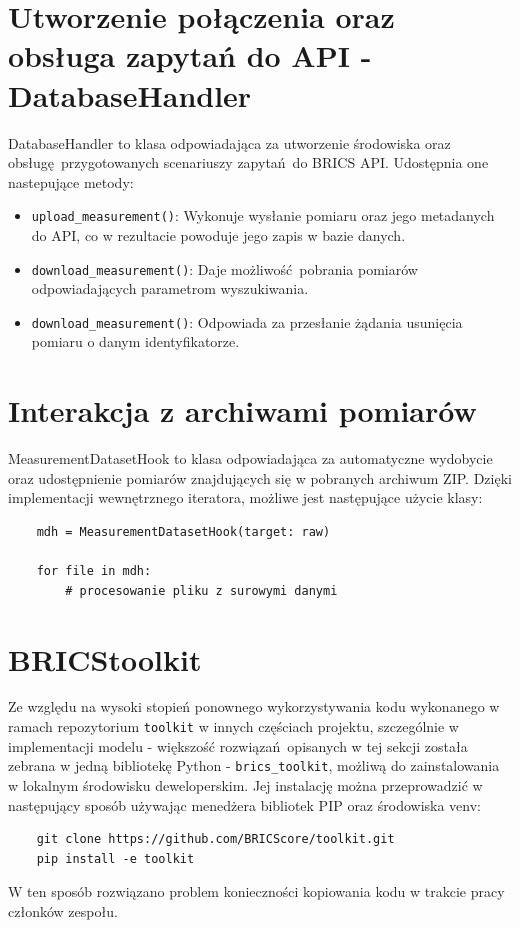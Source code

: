 \section{Utworzenie połączenia oraz obsługa zapytań do API - DatabaseHandler}
DatabaseHandler to klasa odpowiadająca za utworzenie środowiska oraz obsługę przygotowanych scenariuszy zapytań do BRICS API. Udostępnia one nastepujące metody:
\begin{itemize}
	\item \verb|upload_measurement()|: Wykonuje wysłanie pomiaru oraz jego metadanych do API, co w rezultacie powoduje jego zapis w bazie danych.
	\item \verb|download_measurement()|: Daje możliwość pobrania pomiarów odpowiadających parametrom wyszukiwania.
	\item \verb|download_measurement()|: Odpowiada za przesłanie żądania usunięcia pomiaru o danym identyfikatorze.
\end{itemize}

\section{Interakcja z archiwami pomiarów}
\label{dataHook}
MeasurementDatasetHook to klasa odpowiadająca za automatyczne wydobycie oraz udostępnienie pomiarów znajdujących się w pobranych archiwum ZIP. Dzięki implementacji wewnętrznego iteratora, możliwe jest następujące użycie klasy:
\begin{verbatim}
	mdh = MeasurementDatasetHook(target: raw)
	
	for file in mdh:
		# procesowanie pliku z surowymi danymi
\end{verbatim}

\section{BRICStoolkit}
Ze względu na wysoki stopień ponownego wykorzystywania kodu wykonanego w ramach repozytorium \verb*|toolkit| w innych częściach projektu, szczególnie w implementacji modelu - większość rozwiązań opisanych w tej sekcji została zebrana w jedną bibliotekę Python - \verb|brics_toolkit|, możliwą do zainstalowania w lokalnym środowisku deweloperskim.
 Jej instalację można przeprowadzić w następujący sposób używając menedżera bibliotek PIP oraz środowiska venv:
 \begin{verbatim}
 	git clone https://github.com/BRICScore/toolkit.git
 	pip install -e toolkit
 \end{verbatim}
 W ten sposób rozwiązano problem konieczności kopiowania kodu w trakcie pracy członków zespołu.


